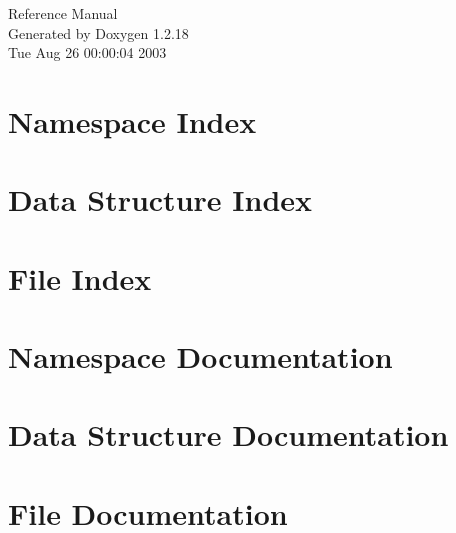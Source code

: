 \documentclass[a4paper]{article}
\begin{document}
\begin{titlepage}
\vspace*{7cm}
\begin{center}
{\Large Reference Manual}\\
\vspace*{1cm}
{\large Generated by Doxygen 1.2.18}\\
\vspace*{0.5cm}
{\small Tue Aug 26 00:00:04 2003}\\
\end{center}
\end{titlepage}
\tableofcontents
{}
\section{Namespace Index}

\section{Data Structure Index}

\section{File Index}

\section{Namespace Documentation}

\section{Data Structure Documentation}




















\section{File Documentation}







































\printindex
\end{document}
